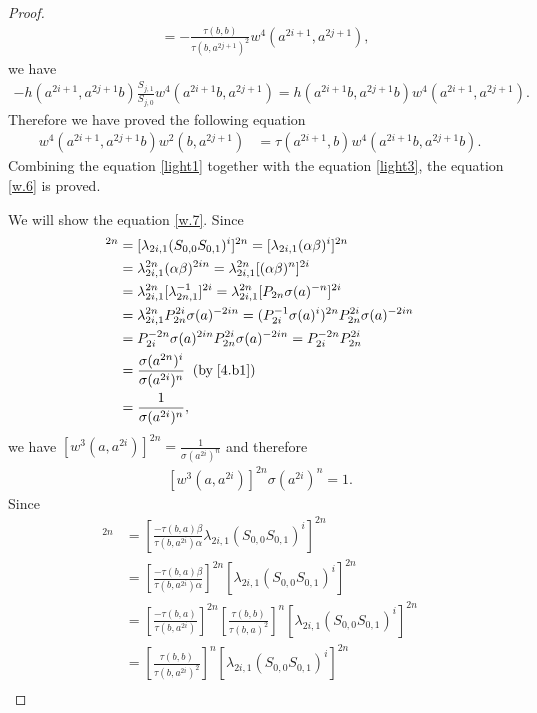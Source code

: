 \documentclass[a4paper,11pt]{amsart}
\numberwithin{equation}{section}
\begin{document}
\begin{proof}
\begin{align*}
&=-\frac{\tau(b,b)}{\tau(b,a^{2j+1})^2} w^4(a^{2i+1},a^{2j+1}),
\end{align*}
we have
\begin{align*}
-h(a^{2i+1},a^{2j+1}b) \frac{S_{j,1}}{S_{j,0}} w^4(a^{2i+1}b,a^{2j+1})=h(a^{2i+1}b,a^{2j+1}b) w^4(a^{2i+1},a^{2j+1}).
\end{align*}
Therefore we have proved the following equation
\begin{align}
\label{light3} w^4(a^{2i+1},a^{2j+1}b) w^2(b,a^{2j+1})&=\tau(a^{2i+1},b) w^4(a^{2i+1}b,a^{2j+1}b).
\end{align}
Combining the equation \eqref{light1} together with the equation \eqref{light3}, the equation \eqref{w.6} is proved.

We will show the equation \eqref{w.7}. Since
\begin{align*}
[w^3(a,a^{2i})]^{2n}&=[\lambda_{2i,1}(S_{0,0} S_{0,1})^i]^{2n}=[\lambda_{2i,1}(\alpha \beta)^i]^{2n}\\
&=\lambda_{2i,1}^{2n} (\alpha \beta)^{2 i n}=\lambda_{2i,1}^{2n} [(\alpha \beta)^{n}]^{2i}\\
&=\lambda_{2i,1}^{2n} [\lambda_{2n,1}^{-1}]^{2i}=\lambda_{2i,1}^{2n} [P_{2n} \sigma(a)^{-n}]^{2i}\\
&=\lambda_{2i,1}^{2n} P_{2n}^{2i} \sigma(a)^{-2 i n}=(P_{2i}^{-1} \sigma(a)^i)^{2n} P_{2n}^{2i} \sigma(a)^{-2 i n}\\
&=P_{2i}^{-2n} \sigma(a)^{2 i n} P_{2n}^{2i} \sigma(a)^{-2 i n}=P_{2i}^{-2n} P_{2n}^{2i}\\
&=\frac{\sigma(a^{2n})^i}{\sigma(a^{2i})^n} \;\;(\text{by}\;\eqref{4.b1})\\
&=\frac{1}{\sigma(a^{2i})^n},
\end{align*}
we have $[w^3(a,a^{2i})]^{2n}=\frac{1}{\sigma(a^{2i})^n}$ and therefore
\begin{align}
\label{light4}[w^3(a,a^{2i})]^{2n} \sigma(a^{2i})^n=1.
\end{align}
Since
\begin{align*}
[w^3(a,a^{2i}b)]^{2n}&=[\frac{-\tau(b,a)\beta }{\tau(b,a^{2i}) \alpha}\lambda_{2i,1}(S_{0,0} S_{0,1})^i]^{2n}\\
&=[\frac{-\tau(b,a)\beta }{\tau(b,a^{2i}) \alpha}]^{2n} [\lambda_{2i,1}(S_{0,0} S_{0,1})^i]^{2n}\\
&=[\frac{-\tau(b,a)}{\tau(b,a^{2i})}]^{2n} [\frac{\tau(b,b)}{\tau(b,a)^2}]^{n} [\lambda_{2i,1}(S_{0,0} S_{0,1})^i]^{2n}\\
&=[\frac{\tau(b,b)}{\tau(b,a^{2i})^2}]^{n} [\lambda_{2i,1}(S_{0,0} S_{0,1})^i]^{2n}\\

\end{align*}
\end{proof}
\end{document}
